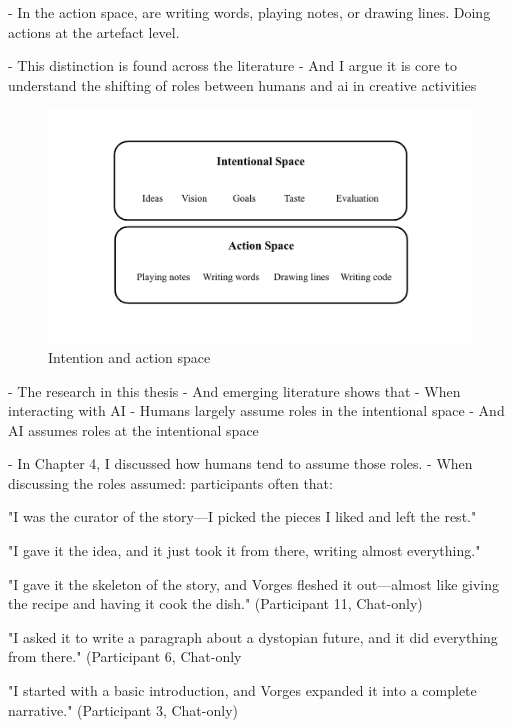 - In the action space, are writing words, playing notes, or drawing lines. Doing actions at the artefact level. 

- This distinction is found across the literature \cite{Palani2024-on}
- And I argue it is core to understand the shifting of roles between humans and ai in creative activities

\begin{figure}
    \centering
    \includegraphics[width=1\linewidth]{intention action spaces.png}
    \caption{Intention and action space}
    \label{fig:enter-label}
\end{figure}

- The research in this thesis
- And emerging literature shows that
- When interacting with AI
- Humans largely assume roles in the intentional space
- And AI assumes roles at the intentional space

- In Chapter 4, I discussed how humans tend to assume those roles. 
- When discussing the roles assumed: participants often that: 

"I was the curator of the story—I picked the pieces I liked and left the rest." 

"I gave it the idea, and it just took it from there, writing almost everything."

"I gave it the skeleton of the story, and Vorges fleshed it out—almost like giving the recipe and having it
cook the dish." (Participant 11, Chat-only)

"I asked it to write a paragraph about a dystopian future, and it did everything from there." (Participant
6, Chat-only

"I started with a basic introduction, and Vorges expanded it into a complete narrative." (Participant 3,
Chat-only)

